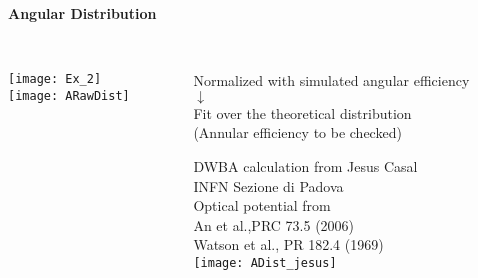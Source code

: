 \documentclass[10pt]{beamer}
\begin{document}
\begin{frame}
\centering
\vspace{0.02\textheight}
\textbf{\Large Angular Distribution}
\vspace{0.01\textheight}
\begin{columns}
	\begin{column}{0.5\textwidth}
		\centering\\
		\vspace{-0.01\textheight}
		\hspace{0.02\textwidth}\texttt{[image: Ex\_2]}\\
		\texttt{[image: ARawDist]}\\
	\end{column}
	\begin{column}{0.5\textwidth}
		\centering\\
		\footnotesize
		\vspace{-0.04\textheight}
		Normalized with simulated angular efficiency\\
		$\downarrow$\\
		Fit over the theoretical distribution\\
		(Annular efficiency to be checked)
		
		\vspace{0.03\textheight}
		\tiny DWBA calculation from Jesus Casal\\
		INFN Sezione di Padova\\				
		\vspace{0.02\textheight}
		Optical potential from\\ An et al.,PRC 73.5 (2006)\\
		Watson et al., PR 182.4 (1969)\\
		\texttt{[image: ADist\_jesus]}\\

	\end{column}
\end{columns}
\end{frame}
\end{document}
